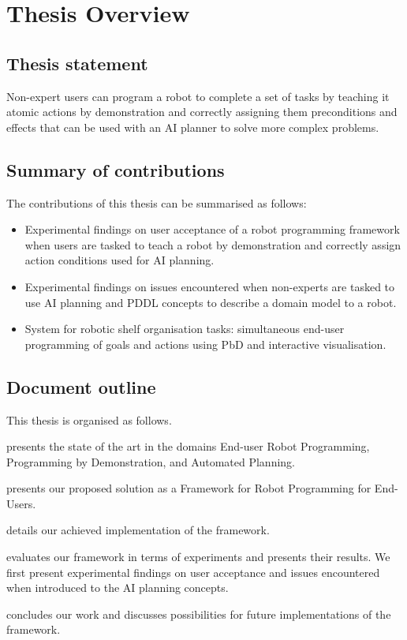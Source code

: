 \section{Thesis Overview}
\subsection{Thesis statement}
Non-expert users can program a robot to complete a set of tasks by teaching it atomic actions by demonstration and correctly assigning them preconditions and effects that can be used with an AI planner to solve more complex problems.

\subsection{Summary of contributions}
The contributions of this thesis can be summarised as follows:
\begin{itemize}
    \item Experimental findings on user acceptance of a robot programming framework when users are tasked to teach a robot by demonstration and correctly assign action conditions used for AI planning.
    \item Experimental findings on issues encountered when non-experts are tasked to use AI planning and PDDL concepts to describe a domain model to a robot.
    \item System for robotic shelf organisation tasks: simultaneous end-user programming of goals and actions using PbD and interactive visualisation.
\end{itemize}

\subsection{Document outline}
This thesis is organised as follows. 

 presents the state of the art in the domains End-user Robot Programming, Programming by Demonstration, and Automated Planning.

 presents our proposed solution as a Framework for Robot Programming for End-Users.

 details our achieved implementation of the framework. 

 evaluates our framework in terms of experiments and presents their results. We first present experimental findings on user acceptance and issues encountered when introduced to the AI planning concepts.

 concludes our work and discusses possibilities for future implementations of the framework.
